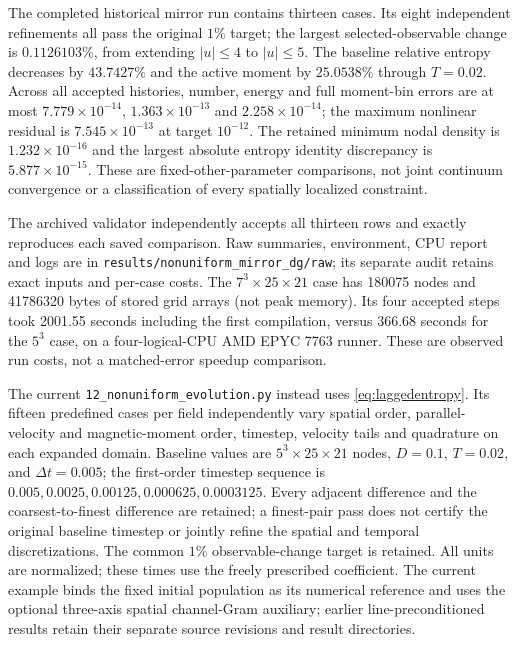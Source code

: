 \documentclass[11pt,letterpaper]{article}
\begin{document}
The completed historical mirror run contains thirteen cases. Its eight
independent refinements all pass the original $1\%$ target; the largest
selected-observable change is $0.1126103\%$, from extending $|u|\le4$ to
$|u|\le5$. The baseline relative entropy decreases by $43.7427\%$ and the
active moment by $25.0538\%$ through $T=0.02$. Across all accepted histories,
number, energy and full moment-bin errors are at most
$7.779\times10^{-14}$, $1.363\times10^{-13}$ and $2.258\times10^{-14}$;
the maximum nonlinear residual is $7.545\times10^{-13}$ at target $10^{-12}$.
The retained minimum nodal density is $1.232\times10^{-16}$ and the largest
absolute entropy identity discrepancy is $5.877\times10^{-15}$.
These are fixed-other-parameter comparisons, not joint continuum convergence
or a classification of every spatially localized constraint.

The archived validator independently accepts all thirteen rows and exactly
reproduces each saved comparison. Raw summaries, environment, CPU report and
logs are in \texttt{results/nonuniform\_mirror\_dg/raw}; its separate audit
retains exact inputs and per-case costs. The $7^3\times25\times21$ case has
180075 nodes and 41786320 bytes of stored grid arrays (not peak memory).
Its four accepted steps took 2001.55 seconds including the first compilation,
versus 366.68 seconds for the $5^3$ case, on a four-logical-CPU AMD EPYC 7763
runner. These are observed run costs, not a matched-error speedup comparison.


The current \texttt{12\_nonuniform\_evolution.py} instead uses
\eqref{eq:laggedentropy}. Its fifteen predefined cases per field independently
vary spatial order, parallel-velocity and magnetic-moment order, timestep,
velocity tails and quadrature on each expanded domain. Baseline values are
$5^3\times25\times21$ nodes, $D=0.1$, $T=0.02$, and $\Delta t=0.005$;
the first-order timestep sequence is $0.005,0.0025,0.00125,0.000625,0.0003125$.
Every adjacent difference and the coarsest-to-finest difference are retained;
a finest-pair pass does not certify the original baseline timestep or jointly
refine the spatial and temporal discretizations.
The common $1\%$ observable-change target is retained. All units are normalized;
these times use the freely prescribed coefficient. The current example binds
the fixed initial population as its numerical reference and uses the optional
three-axis spatial channel-Gram auxiliary; earlier line-preconditioned results
retain their separate source revisions and result directories.
\end{document}
